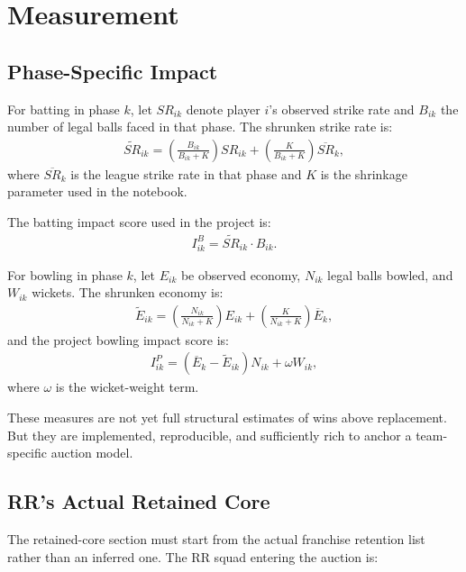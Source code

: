 \documentclass[11pt]{article}
\begin{document}
\section{Measurement}

\subsection{Phase-Specific Impact}

For batting in phase \(k\), let \(SR_{ik}\) denote player \(i\)'s observed strike rate and \(B_{ik}\) the number of legal balls faced in that phase. The shrunken strike rate is:
\begin{align}
\widetilde{SR}_{ik}
=
\left(\frac{B_{ik}}{B_{ik}+K}\right)SR_{ik}
+
\left(\frac{K}{B_{ik}+K}\right)\overline{SR}_{k},
\end{align}
where \(\overline{SR}_{k}\) is the league strike rate in that phase and \(K\) is the shrinkage parameter used in the notebook.

The batting impact score used in the project is:
\begin{align}
I_{ik}^{B}=\widetilde{SR}_{ik}\cdot B_{ik}.
\end{align}

For bowling in phase \(k\), let \(E_{ik}\) be observed economy, \(N_{ik}\) legal balls bowled, and \(W_{ik}\) wickets. The shrunken economy is:
\begin{align}
\widetilde{E}_{ik}
=
\left(\frac{N_{ik}}{N_{ik}+K}\right)E_{ik}
+
\left(\frac{K}{N_{ik}+K}\right)\overline{E}_{k},
\end{align}
and the project bowling impact score is:
\begin{align}
I_{ik}^{P}
=
(\overline{E}_{k}-\widetilde{E}_{ik})N_{ik}+\omega W_{ik},
\end{align}
where \(\omega\) is the wicket-weight term.

These measures are not yet full structural estimates of wins above replacement. But they are implemented, reproducible, and sufficiently rich to anchor a team-specific auction model.

\subsection{RR's Actual Retained Core}

The retained-core section must start from the actual franchise retention list rather than an inferred one. The RR squad entering the auction is:


\end{document}
